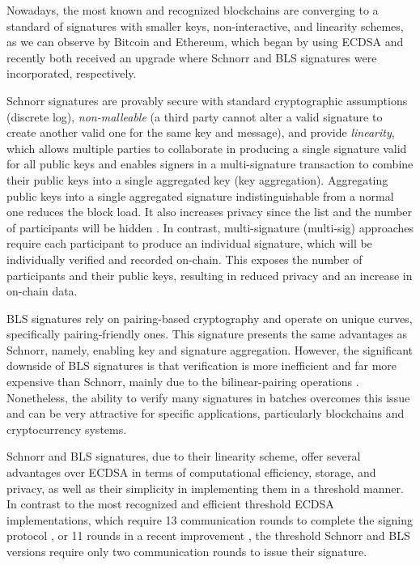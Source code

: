 Nowadays, the most known and recognized blockchains are converging to a standard of signatures with smaller keys, non-interactive, and linearity schemes, as we can observe by Bitcoin and Ethereum, which began by using ECDSA and recently both received an upgrade where Schnorr and BLS signatures were incorporated, respectively.

Schnorr signatures \cite{schnorrnotes} are provably secure with standard cryptographic assumptions (discrete log), \textit{non-malleable} (a third party cannot alter a valid signature to create another valid one for the same key and message), and provide \textit{linearity}, which allows multiple parties to collaborate in producing a single signature valid for all public keys and enables signers in a multi-signature transaction to combine their public keys into a single aggregated key (key aggregation). Aggregating public keys into a single aggregated signature indistinguishable from a normal one reduces the block load. It also increases privacy since the list and the number of participants will be hidden \cite{schnorradvantages}. In contrast, multi-signature (multi-sig) approaches require each participant to produce an individual signature, which will be individually verified and recorded on-chain. This exposes the number of participants and their public keys, resulting in reduced privacy and an increase in on-chain data. 

BLS signatures \cite{blsdraft} rely on pairing-based cryptography and operate on unique curves, specifically pairing-friendly ones. This signature presents the same advantages as Schnorr, namely, enabling key and signature aggregation. However, the significant downside of BLS signatures is that verification is more inefficient and far more expensive than Schnorr, mainly due to the bilinear-pairing operations \cite{blsbetterthanschnorr}. Nonetheless, the ability to verify many signatures in batches overcomes this issue and can be very attractive for specific applications, particularly blockchains and cryptocurrency systems. 

Schnorr and BLS signatures, due to their linearity scheme, offer several advantages over ECDSA in terms of computational efficiency, storage, and privacy, as well as their simplicity in implementing them in a threshold manner. In contrast to the most recognized and efficient threshold ECDSA implementations, which require 13 communication rounds to complete the signing protocol \cite{lindell18,gennaro18}, or 11 rounds in a recent improvement \cite{gennaro20}, the threshold Schnorr and BLS versions require only two communication rounds to issue their signature.

